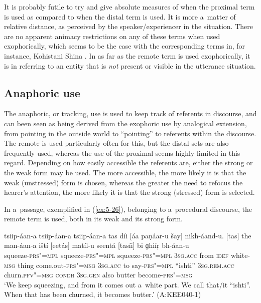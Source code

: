 It is probably futile to try and give absolute measures of when the proximal term is used as compared to when the distal term is used. It is more a~matter of relative distance, as perceived by the speaker/experiencer in the situation. There are no apparent animacy restrictions on any of these terms when used exophorically, which seems to be the case with the corresponding terms in, for instance, Kohistani Shina \citep[135]{schmidtkohistani2001}. In as far as the remote term is used exophorically, it is in referring to an entity that is \textit{not} present or visible in the utterance situation. 


\subsection{Anaphoric use}
\label{subsec:5-2-4}

The anaphoric, or tracking, use is used to keep track of referents in discourse, and can been seen as being derived from the exophoric use by analogical extension, from pointing in the outside world to ``pointing'' to referents within the discourse. The remote is used particularly often for this, but the distal sets are also frequently used, whereas the use of the proximal seems highly limited in this regard. Depending on how easily accessible the referents are, either the strong or the weak form may be used. The more accessible, the more likely it is that the weak (unstressed) form is chosen, whereas the greater the need to refocus the hearer's attention, the more likely it is that the strong (stressed) form is selected. 


In a~passage, exemplified in (\ref{ex:5-26}), belonging to a~procedural discourse, the remote term is used, both in its weak and its strong form.


\begin{exe}
\ex
\label{ex:5-26}
\gll tsiip-áan-a tsiip-áan-a tsiip-áan-a tas díi [áa paṇáar-u
 šay] nikh-áand-u. [tas] the man-áan-a iští [eetás] matíl-u
seentá [tasíi] bi ɡhiíṛ bh-áan-u \\
squeeze-\textsc{prs"=mpl} squeeze-\textsc{prs"=mpl} squeeze-\textsc{prs"=mpl} \textsc{3sg.acc} from
\textsc{idef} white-\textsc{msg} thing come.out-\textsc{prs"=msg} \textsc{3sg.acc}
to say-\textsc{prs"=mpl} ``ishti'' \textsc{3sg.rem.acc} churn.\textsc{pfv"=msg}
\textsc{condh} \textsc{3sg.gen} also butter become-\textsc{prs"=msg}\\
\glt `We keep squeezing, and from it comes out a~white part. We call that/it ``ishti''. When that has been
churned, it becomes butter.' (A:KEE040-1)
\end{exe}

